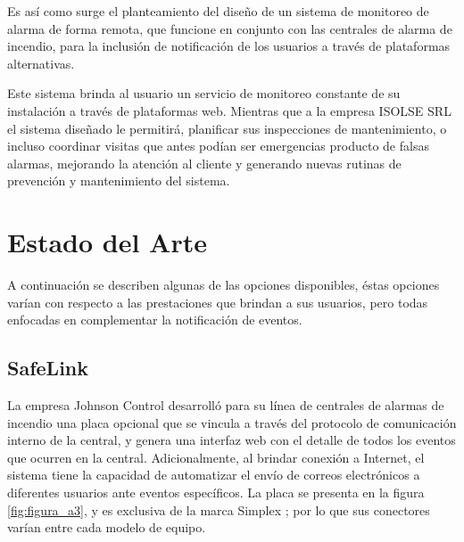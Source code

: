 Es así como surge el planteamiento del diseño de un sistema de monitoreo de alarma de forma remota, que funcione en conjunto con las centrales de alarma de incendio, para la  inclusión de notificación de los usuarios a través de plataformas alternativas.

Este sistema brinda al usuario un servicio de monitoreo constante de su instalación a través de plataformas web. Mientras que a la empresa ISOLSE SRL el sistema diseñado le permitirá, planificar sus inspecciones de mantenimiento, o incluso coordinar visitas que antes podían ser emergencias producto de falsas alarmas, mejorando la atención al cliente y generando nuevas rutinas de prevención y mantenimiento del sistema.


\section{Estado del Arte}

A continuación se describen algunas de las opciones disponibles, éstas opciones varían con respecto a las prestaciones que brindan a sus usuarios, pero todas enfocadas en complementar la notificación de eventos. 

\subsection{SafeLink}

La empresa Johnson Control desarrolló para su línea de centrales de alarmas de incendio una placa opcional que se vincula a través del protocolo de comunicación interno de la central, y genera una interfaz web con el detalle de todos los eventos que ocurren en la central. Adicionalmente, al brindar conexión a Internet, el sistema tiene la capacidad de automatizar el envío de correos electrónicos a diferentes usuarios ante eventos específicos. La placa se presenta en la figura \ref{fig:figura_a3}, y es exclusiva de la marca Simplex \cite{safelink}; por lo que sus conectores varían entre cada modelo de equipo.

